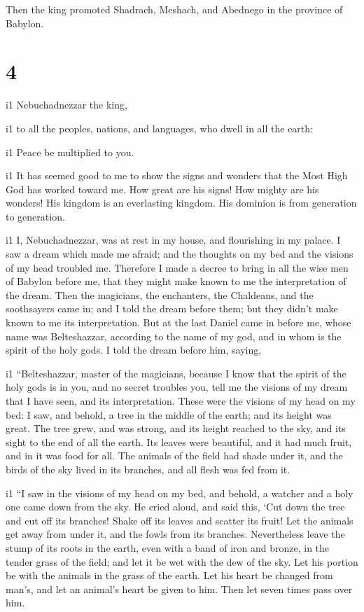  Then the king promoted Shadrach, Meshach, and Abednego in
the province of Babylon.

\hypertarget{section-3}{%
\section{4}\label{section-3}}

i1 Nebuchadnezzar the king,

i1 to all the peoples, nations, and languages, who dwell in all the
earth:

i1 Peace be multiplied to you.

i1 It has seemed good to me to show the signs and wonders
that the Most High God has worked toward me.  How great are
his signs! How mighty are his wonders! His kingdom is an everlasting
kingdom. His dominion is from generation to generation.

i1 I, Nebuchadnezzar, was at rest in my house, and
flourishing in my palace.  I saw a dream which made me
afraid; and the thoughts on my bed and the visions of my head troubled
me.  Therefore I made a decree to bring in all the wise men
of Babylon before me, that they might make known to me the
interpretation of the dream.  Then the magicians, the
enchanters, the Chaldeans, and the soothsayers came in; and I told the
dream before them; but they didn't make known to me its interpretation.
 But at the last Daniel came in before me, whose name was
Belteshazzar, according to the name of my god, and in whom is the spirit
of the holy gods. I told the dream before him, saying,

i1 ``Belteshazzar, master of the magicians, because I know
that the spirit of the holy gods is in you, and no secret troubles you,
tell me the visions of my dream that I have seen, and its
interpretation.  These were the visions of my head on my
bed: I saw, and behold, a tree in the middle of the earth; and its
height was great.  The tree grew, and was strong, and its
height reached to the sky, and its sight to the end of all the earth.
 Its leaves were beautiful, and it had much fruit, and in
it was food for all. The animals of the field had shade under it, and
the birds of the sky lived in its branches, and all flesh was fed from
it.

i1 ``I saw in the visions of my head on my bed, and behold,
a watcher and a holy one came down from the sky.  He cried
aloud, and said this, `Cut down the tree and cut off its branches! Shake
off its leaves and scatter its fruit! Let the animals get away from
under it, and the fowls from its branches.  Nevertheless
leave the stump of its roots in the earth, even with a band of iron and
bronze, in the tender grass of the field; and let it be wet with the dew
of the sky. Let his portion be with the animals in the grass of the
earth.  Let his heart be changed from man's, and let an
animal's heart be given to him. Then let seven times pass over him.

